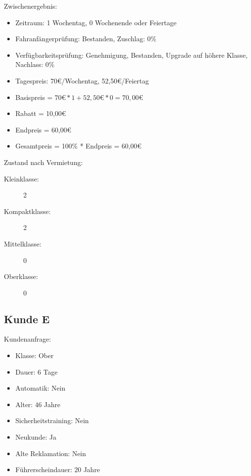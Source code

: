 Zwischenergebnis:
\begin{itemize}
	\item Zeitraum: 1 Wochentag, 0 Wochenende oder Feiertage
	\item Fahranfängerprüfung: Bestanden, Zuschlag: 0\%
	\item Verfügbarkeitsprüfung: Genehmigung, Bestanden, Upgrade auf höhere Klasse, Nachlass: 0\%
	\item Tagespreis: 70€/Wochentag, 52,50€/Feiertag
	\item Basispreis = $70€ * 1 + 52,50€ * 0 = 70,00€$
	\item Rabatt = 10,00€
	\item Endpreis = 60,00€
	\item Gesamtpreis = 100\% * Endpreis = 60,00€
\end{itemize}

Zustand nach Vermietung:
\begin{description}
	\item[Kleinklasse:] 2
	\item[Kompaktklasse:] 2
	\item[Mittelklasse:] 0
	\item[Oberklasse:] 0
\end{description}

\subsection{Kunde E}

Kundenanfrage:
\begin{itemize}
	\item Klasse: Ober
	\item Dauer: 6 Tage
	\item Automatik: Nein
	
	\item Alter: 46 Jahre
	\item Sicherheitstraining: Nein
	\item Neukunde: Ja
	\item Alte Reklamation: Nein
	\item Führerscheindauer: 20 Jahre
\end{itemize}

